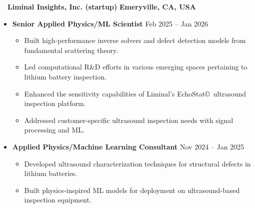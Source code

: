 ~~{\color{black}\textbf{Liminal Insights, Inc. (startup)} \hfill  \textbf{Emeryville, CA, USA}}\par
\begin{itemize}
    \item
    \textbf{Senior Applied Physics/ML Scientist}
    \hfill  {Feb 2025 -- Jan 2026} \par
        \begin{itemize}
            \item Built high-performance inverse solvers and defect detection models from fundamental scattering theory.  
            \item Led computational R\&D efforts in various emerging spaces pertaining to lithium battery inspection.               
            \item Enhanced the sensitivity capabilities of Liminal's EchoStat\copyright~ultrasound inspection platform. 
            \item Addressed customer-specific ultrasound inspection needs with signal processing and ML. 
        \end{itemize}
    \item
        \textbf{Applied Physics/Machine Learning Consultant}
        \hfill  {Nov 2024 -- Jan 2025} \par
        \begin{itemize}
            \item Developed ultrasound characterization techniques for structural defects in lithium batteries. 
            \item Built physics-inspired ML models for deployment on ultrasound-based inspection equipment.
        \end{itemize}
\end{itemize}